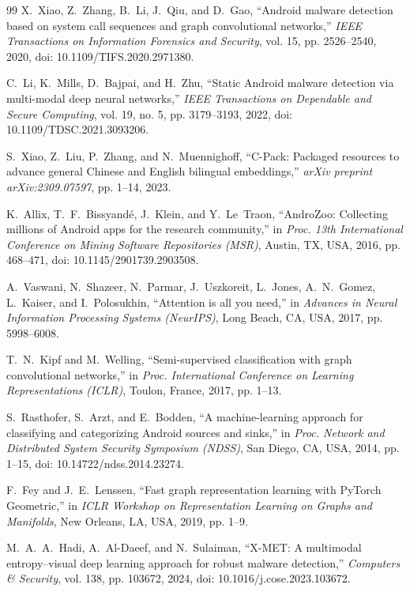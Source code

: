 \documentclass[12pt,a4paper,oneside]{report}
\begin{document}
\begin{thebibliography}{99}
X.~Xiao, Z.~Zhang, B.~Li, J.~Qiu, and D.~Gao,
``Android malware detection based on system call sequences and graph convolutional networks,''
\textit{IEEE Transactions on Information Forensics and Security},
vol. 15, pp. 2526--2540,
2020, doi: 10.1109/TIFS.2020.2971380.

C.~Li, K.~Mills, D.~Bajpai, and H.~Zhu,
``Static Android malware detection via multi-modal deep neural networks,''
\textit{IEEE Transactions on Dependable and Secure Computing},
vol. 19, no. 5, pp. 3179--3193,
2022, doi: 10.1109/TDSC.2021.3093206.

S.~Xiao, Z.~Liu, P.~Zhang, and N.~Muennighoff,
``C-Pack: Packaged resources to advance general Chinese and English bilingual embeddings,''
\textit{arXiv preprint arXiv:2309.07597},
pp. 1--14, 2023.

K.~Allix, T.~F.~Bissyand\'{e}, J.~Klein, and Y.~Le~Traon,
``AndroZoo: Collecting millions of Android apps for the research community,''
in \textit{Proc. 13th International Conference on Mining Software Repositories (MSR)},
Austin, TX, USA, 2016, pp. 468--471,
doi: 10.1145/2901739.2903508.

A.~Vaswani, N.~Shazeer, N.~Parmar, J.~Uszkoreit, L.~Jones, A.~N.~Gomez, L.~Kaiser, and I.~Polosukhin,
``Attention is all you need,''
in \textit{Advances in Neural Information Processing Systems (NeurIPS)},
Long Beach, CA, USA, 2017, pp. 5998--6008.

T.~N.~Kipf and M.~Welling,
``Semi-supervised classification with graph convolutional networks,''
in \textit{Proc. International Conference on Learning Representations (ICLR)},
Toulon, France, 2017, pp. 1--13.

S.~Rasthofer, S.~Arzt, and E.~Bodden,
``A machine-learning approach for classifying and categorizing Android sources and sinks,''
in \textit{Proc. Network and Distributed System Security Symposium (NDSS)},
San Diego, CA, USA, 2014, pp. 1--15,
doi: 10.14722/ndss.2014.23274.

F.~Fey and J.~E.~Lenssen,
``Fast graph representation learning with PyTorch Geometric,''
in \textit{ICLR Workshop on Representation Learning on Graphs and Manifolds},
New Orleans, LA, USA, 2019, pp. 1--9.

M.~A.~A.~Hadi, A.~Al-Daeef, and N.~Sulaiman,
``X-MET: A multimodal entropy--visual deep learning approach for robust malware detection,''
\textit{Computers \& Security},
vol. 138, pp. 103672, 2024,
doi: 10.1016/j.cose.2023.103672.


\end{thebibliography}
\end{document}
